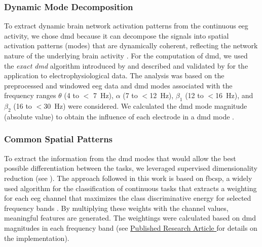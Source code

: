 \subsubsection{Dynamic Mode Decomposition}
To extract dynamic brain network activation patterns from the continuous \gls{eeg} activity, we chose \gls{dmd} because it can decompose the signals into spatial activation patterns (modes) that are dynamically coherent, reflecting the network nature of the underlying brain activity \cite{Brunton2016}. For the computation of \gls{dmd}, we used the \textit{exact \gls{dmd}} algorithm introduced by \citeauthor{Tu2014} \cite{Tu2014} and described and validated by \citeauthor{Brunton2016} \cite{Brunton2016} for the application to electrophysiological data. The analysis was based on the preprocessed and windowed \gls{eeg} data and \gls{dmd} modes associated with the frequency ranges $\theta$ (4 to $<$ 7~Hz), $\alpha$ (7 to $<$12~Hz), $\beta_1$ (12 to $<$16~Hz), and $\beta_2$ (16 to $<$30~Hz) were considered. We calculated the \gls{dmd} mode magnitude (absolute value) to obtain the influence of each electrode in a \gls{dmd} mode \cite{Brunton2016}.

\subsubsection{Common Spatial Patterns}
To extract the information from the \gls{dmd} modes that would allow the best possible differentiation between the tasks, we leveraged supervised dimensionality reduction (see ). The approach followed in this work is based on \gls{fbcsp}, a widely used algorithm for the classification of continuous tasks that extracts a weighting for each \gls{eeg} channel that maximizes the class discriminative energy for selected frequency bands \cite{Ang2012}. By multiplying these weights with the channel values, meaningful features are generated. The weightings were calculated based on \gls{dmd} magnitudes in each frequency band (see \hyperref[pub:paperI]{Published Research Article } for details on the implementation).

